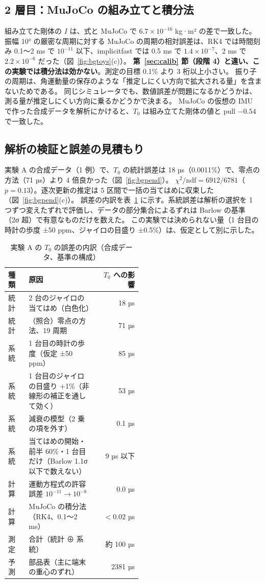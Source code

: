 \documentclass[paper=a4paper,fontsize=10pt,twocolumn,column_gap=2zw,line_length=24zw,number_of_lines=46,head_space=20mm]{jlreq}
\begin{document}
\subsection{2 層目：MuJoCo の組み立てと積分法}

組み立てた剛体の $I$ は、式と MuJoCo で $6.7\times10^{-16}$ kg·m² の差で一致した。
振幅 10° の厳密な周期に対する MuJoCo の周期の相対誤差は、RK4 では時間刻み 0.1〜2 ms で $10^{-11}$ 以下、implicitfast では 0.5 ms で $1.4\times10^{-7}$、2 ms で $2.2\times10^{-6}$ だった（図~\ref{fig:bgtoys}(c)）。
\textbf{第~\ref{sec:calib} 節（段階 4）と違い、この実験では積分法は効かない}。測定の目標 0.1\% より 3 桁以上小さい。
振り子の周期は、角運動量の保存のような「推定しにくい方向で拡大される量」を含まないためである。
同じシミュレータでも、数値誤差が問題になるかどうかは、測る量が推定しにくい方向に乗るかどうかで決まる。
MuJoCo の仮想の IMU で作った合成データを解析にかけると、$T_0$ は組み立てた剛体の値と pull $-0.54$ で一致した。

\subsection{解析の検証と誤差の見積もり}

実験 A の合成データ（1 例）で、$T_0$ の統計誤差は 18 µs（0.0011\%）で、零点の方法（71 µs）より 4 倍良かった（図~\ref{fig:bgpend}）。
$\chi^2/\mathrm{ndf} = 6912/6781$（$p=0.13$）。逐次更新の推定は 5 区間で一括の当てはめに収束した（図~\ref{fig:bgpend}(c)）。
誤差の内訳を表~\ref{tab:bangai} に示す。系統誤差は解析の選択を 1 つずつ変えたずれで評価し、データの部分集合によるずれは Barlow の基準 \cite{barlow2002}（2σ 超）で有意なものだけを数えた。
この実験では決められない量（1 台目の時計の歩度 ±50 ppm、ジャイロの目盛り ±0.5\%）は、仮定として別に示した。

\begin{table}[t]\centering\footnotesize
\caption{実験 A の $T_0$ の誤差の内訳（合成データ、基準の構成）}\label{tab:bangai}
\setlength{\tabcolsep}{2.5pt}
\begin{tabular}{lp{0.52\linewidth}r}\toprule
種類 & 原因 & $T_0$ への影響 \\\midrule
統計 & 2 台のジャイロの当てはめ（白色化） & 18 µs \\
統計 & （照合）零点の方法、19 周期 & 71 µs \\
系統 & 1 台目の時計の歩度（仮定 ±50 ppm） & 85 µs \\
系統 & 1 台目のジャイロの目盛り +1\%（非線形の補正を通して効く） & 53 µs \\
系統 & 減衰の模型（2 乗の項を外す） & 0.1 µs \\
系統 & 当てはめの開始・前半 60\%・1 台目だけ（Barlow 1.1σ 以下で数えない） & 9 µs 以下 \\
計算 & 運動方程式の許容誤差 $10^{-11}\to10^{-8}$ & 0.0 µs \\
計算 & MuJoCo の積分法（RK4、0.1〜2 ms） & $<0.02$ µs \\\midrule
測定 & 合計（統計 ⊕ 系統） & 約 100 µs \\
予測 & 部品表（主に端末の重心のずれ） & 2381 µs \\\bottomrule
\end{tabular}
\end{table}
\end{document}
